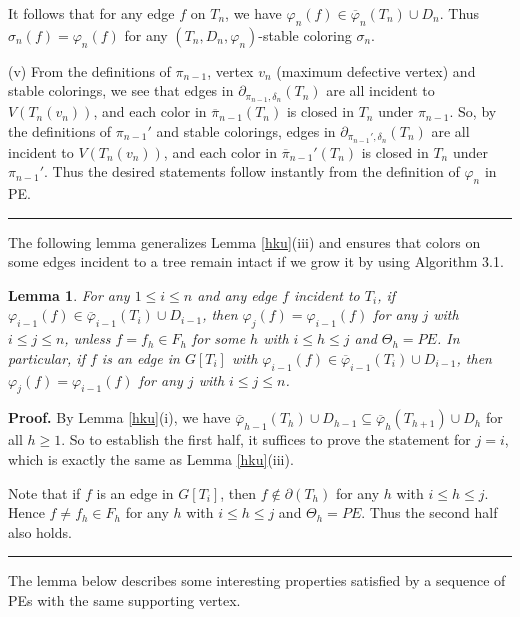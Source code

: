 \documentclass[11pt]{article}
\newtheorem{lemma}[theorem]{Lemma}
\newcommand{\phibar}{\overline{\varphi}}
\newcommand{\phiv}{\varphi}
\def\qed{\hfill \rule{4pt}{7pt}}
\begin{document}
It follows that for any edge $f$ on $T_n$, we have $\varphi_n(f) \in \phibar_n(T_n)\cup D_n$. Thus $\sigma_n(f)=\varphi_n(f)$ 
for any $(T_n, D_n, \varphi_n)$-stable coloring $\sigma_n$. 

(v) From the definitions of $\pi_{n-1}$, vertex $v_n$ (maximum defective vertex) and stable colorings, we see that edges 
in $\partial_{\pi_{n-1}, \delta_n}(T_n)$ are all incident to $V(T_n(v_n))$, and each color in  $\overline{\pi}_{n-1}(T_n)$ is 
closed in $T_n$ under $\pi_{n-1}$. So, by the definitions of $\pi_{n-1}'$ and stable colorings, edges in $\partial_{\pi_{n-1}', 
\delta_n}(T_n)$ are all incident to $V(T_n(v_n))$, and each color in $\overline{\pi}_{n-1}'(T_n)$ is closed in $T_n$ under $\pi_{n-1}'$. 
Thus the desired statements follow instantly from the definition of $\varphi_n$ in PE. \qed

\vskip 3mm

The following lemma generalizes Lemma \ref{hku}(iii) and ensures that colors on some edges incident to a 
tree remain intact if we grow it by using Algorithm 3.1.  

\begin{lemma}\label{samecolor}
For any $1\le i \le n$ and any edge $f$ incident to $T_i$, if
$\phiv_{i-1}(f)\in\phibar_{i-1}(T_i)\cup D_{i-1}$, then $\phiv_j(f) = \phiv_{i-1}(f)$ for any $j$ with $i \le j \le n$, unless 
$f=f_h \in F_h$ for some $h$ with $i\le h \le j$ and $\Theta_h=PE$. In particular, if $f$ is an edge in $G[T_i]$ with 
$\phiv_{i-1}(f)\in\phibar_{i-1}(T_i)\cup D_{i-1}$, then $\phiv_j(f) = \phiv_{i-1}(f)$ for any $j$ with $i\le j \le n$.
\end{lemma}

{\bf Proof.}  By Lemma \ref{hku}(i), we have $\phibar_{h-1}(T_h)\cup D_{h-1} \subseteq \phibar_h(T_{h+1})\cup D_h$ for 
all $h \ge 1$. So to establish the first half, it suffices to prove the statement for $j=i$, which is exactly the same as
Lemma \ref{hku}(iii).  

Note that if $f$ is an edge in $G[T_i]$, then $f\notin \partial(T_h)$ for any $h$ with $i\le h\le j$. Hence
$f\neq f_h\in F_h$ for any $h$ with $i\le h\le j$ and $\Theta_h=PE$. Thus the second half also holds. \qed

\vskip 3mm
The lemma below describes some interesting properties satisfied by a sequence of PEs with the same supporting vertex.
\end{document}
